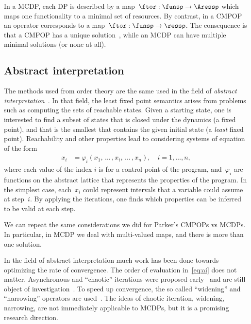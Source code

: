 In a MCDP, each DP is described by a \scottcontinuous map~$\ftor:\funsp\rightarrow\Aressp$
which maps one functionality to a minimal set of resources. By contrast,
in a CMPOP an operator corresponds to a \scottcontinuous map~$\ftor:\funsp\rightarrow\ressp$.
The consequence is that a CMPOP has a unique solution~\cite[Theorem 8]{parkerjr89partial},
while an MCDP can have multiple minimal solutions (or none at all).

\subsection{Abstract interpretation}

The methods used from order theory are the same used in the field
of \emph{abstract interpretation}~\cite{cousot14abstract}. In
that field, the least fixed point semantics arises from problems such
as computing the sets of reachable states. Given a starting state,
one is interested to find a subset of states that is closed under
the dynamics (\ie a fixed point), and that is the smallest that contains
the given initial state (\ie a \emph{least} fixed point). Reachability
and other properties lead to considering systems of equation of the
form
\begin{align}
  x_{i} & =\varphi_{i}(x_{1},\,\dots\,,x_{i},\,\dots\,,x_{n}),\quad i=1,\dots,n,\label{eq:ai}
\end{align}
where each value of the index $i$ is for a control point of the program,
and~$\varphi_{i}$ are \scottcontinuous functions on the abstract
lattice that represents the properties of the program. In the simplest
case, each~$x_{i}$ could represent intervals that a variable could
assume at step~$i$. By applying the iterations, one finds which
properties can be inferred to be valid at each step.

We can repeat the same considerations we did for Parker's CMPOPs vs
MCDPs. In particular, in MCDP we deal with multi-valued maps, and
there is more than one solution.

In the field of abstract interpretation much work has been done towards
optimizing the rate of convergence. The order of evaluation in~\cref{eq:ai}
does not matter. Asynchronous and ``chaotic'' iterations were proposed
early~\cite{cousot77asynchronous} and are still object of investigation~\cite{bourdoncleefficient}.
To speed up convergence, the so called ``widening'' and ``narrowing''
operators are used~\cite{cortesi11widening}. The ideas of chaotic
iteration, widening, narrowing, are not immediately applicable to
MCDPs, but it is a promising research direction.


